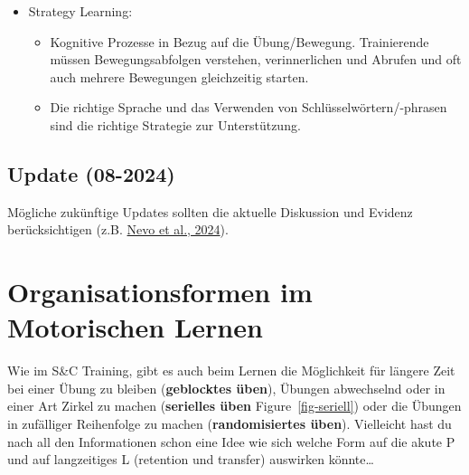 \documentclass[
  letterpaper,
  DIV=11,
  numbers=noendperiod]{scrreprt}
\providecommand{\tightlist}{%
  \setlength{\itemsep}{0pt}\setlength{\parskip}{0pt}}
\begin{document}
\begin{itemize}
  \begin{itemize}
  \tightlist
  \item
    Die Person muss Bewegungen erforschen, um die besten Erfolge zu
    finden und versucht diese dann zu reproduzieren.
  \item
    Durch das Erkennen von erfolgreichen Wiederholungen kommt es zu
    geringerer akuter Verbesserung, aber das Behalten
    (\textbf{retention}) ist dafür länger als beim Error based learning.
  \item
    Positive Verstärkung bei gelungenen Bewegungen ist die Methode der
    Wahl. Die Wichtigkeit der Methode steigt mit dem Grad des
    Fortschritts der lernenden Person
  \end{itemize}
\item
  Strategy Learning:

  \begin{itemize}
  \tightlist
  \item
    Kognitive Prozesse in Bezug auf die Übung/Bewegung. Trainierende
    müssen Bewegungsabfolgen verstehen, verinnerlichen und Abrufen und
    oft auch mehrere Bewegungen gleichzeitig starten.
  \item
    Die richtige Sprache und das Verwenden von Schlüsselwörtern/-phrasen
    sind die richtige Strategie zur Unterstützung.
  \end{itemize}
\end{itemize}

\subsection{Update (08-2024)}\label{update-08-2024}

Mögliche zukünftige Updates sollten die aktuelle Diskussion und Evidenz
berücksichtigen (z.B. \href{https://peerj.com/articles/17718/}{Nevo et
al., 2024}).

\section{Organisationsformen im Motorischen
Lernen}\label{organisationsformen-im-motorischen-lernen}

Wie im S\&C Training, gibt es auch beim Lernen die Möglichkeit für
längere Zeit bei einer Übung zu bleiben (\textbf{geblocktes üben}),
Übungen abwechselnd oder in einer Art Zirkel zu machen
(\textbf{serielles üben} Figure~\ref{fig-seriell}) oder die Übungen in
zufälliger Reihenfolge zu machen (\textbf{randomisiertes üben}).
Vielleicht hast du nach all den Informationen schon eine Idee wie sich
welche Form auf die akute P und auf langzeitiges L (retention und
transfer) auswirken könnte\ldots{}
\end{document}

